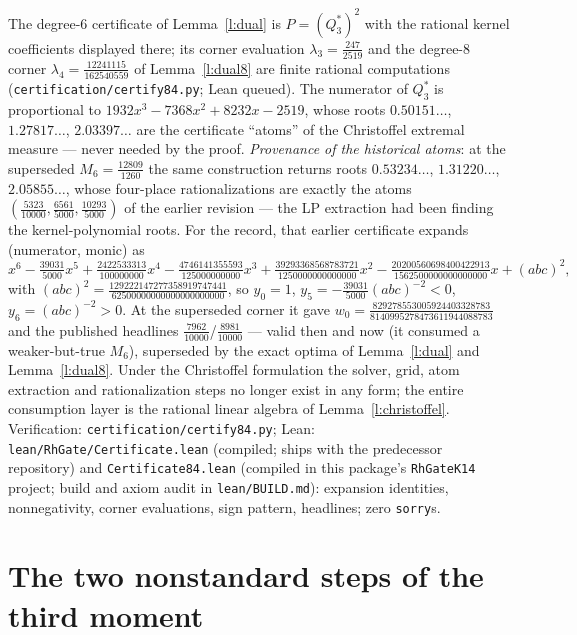 \documentclass[11pt]{article}
\numberwithin{equation}{section}
\theoremstyle{definition}
\theoremstyle{remark}
\begin{document}
The degree-6 certificate of Lemma~\ref{l:dual} is
$P=(Q_3^*)^2$ with the rational kernel coefficients displayed
there; its corner evaluation $\lambda_3=\tfrac{247}{2519}$ and
the degree-8 corner $\lambda_4=\tfrac{12241115}{162540559}$ of
Lemma~\ref{l:dual8} are finite rational computations
(\texttt{certification/certify84.py}; Lean queued). The
numerator of $Q_3^*$ is proportional to
$1932x^3-7368x^2+8232x-2519$, whose roots
$0.50151\ldots$, $1.27817\ldots$, $2.03397\ldots$ are the
certificate ``atoms'' of the Christoffel extremal measure ---
never needed by the proof. \emph{Provenance of the historical
atoms}: at the superseded $M_6=\tfrac{12809}{1260}$ the same
construction returns roots $0.53234\ldots$, $1.31220\ldots$,
$2.05855\ldots$, whose four-place rationalizations are
exactly the atoms $(\tfrac{5323}{10000},\tfrac{6561}{5000},
\tfrac{10293}{5000})$ of the earlier revision --- the LP
extraction had been finding the kernel-polynomial roots. For
the record, that earlier certificate expands (numerator,
monic) as
\[
x^6-\tfrac{39031}{5000}x^5+\tfrac{2422533313}{100000000}x^4
-\tfrac{4746141355593}{125000000000}x^3
+\tfrac{39293368568783721}{1250000000000000}x^2
-\tfrac{20200560698400422913}{1562500000000000000}x
+(abc)^2,
\]
with $(abc)^2=\tfrac{129222147277358919747441}
{62500000000000000000000}$, so $y_0=1$,
$y_5=-\tfrac{39031}{5000}(abc)^{-2}<0$, $y_6=(abc)^{-2}>0$.
At the superseded corner it gave
$w_0=\tfrac{829278553005924403328783}
{8140995278473611944088783}$ and the published headlines
$\tfrac{7962}{10000}$/$\tfrac{8981}{10000}$ --- valid then and
now (it consumed a weaker-but-true $M_6$), superseded by the
exact optima of Lemma~\ref{l:dual} and Lemma~\ref{l:dual8}.
Under the Christoffel formulation the solver, grid, atom
extraction and rationalization steps no longer exist in any
form; the entire consumption layer is the rational linear
algebra of Lemma~\ref{l:christoffel}. Verification:
\texttt{certification/certify84.py}; Lean:
\texttt{lean/RhGate/Certificate.lean} (compiled; ships with
the predecessor repository) and \texttt{Certificate84.lean}
(compiled in this package's \texttt{RhGateK14} project;
build and axiom audit in \texttt{lean/BUILD.md}): expansion
identities, nonnegativity, corner evaluations, sign pattern,
headlines; zero \texttt{sorry}s.


\section{The two nonstandard steps of the third moment}
\label{a:v1}
\end{document}
